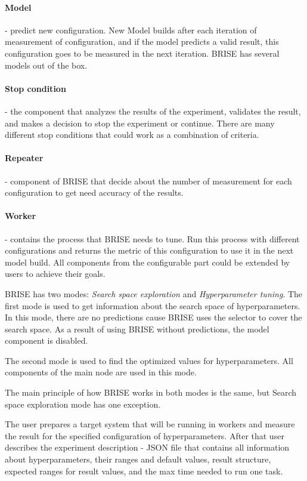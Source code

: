 \paragraph{Model} - predict new configuration. New Model builds after each iteration of measurement of configuration, and if the model predicts a valid result, this configuration goes to be measured in the next iteration. BRISE has several models out of the box.
\paragraph{Stop condition} - the component that analyzes the results of the experiment, validates the result, and makes a decision to stop the experiment or continue. There are many different stop conditions that could work as a combination of criteria.
\paragraph{Repeater} - component of BRISE that decide about the number of measurement for each configuration to get need accuracy of the results. 
\paragraph{Worker} - contains the process that BRISE needs to tune. Run this process with different configurations and returns the metric of this configuration to use it in the next model build.
All components from the configurable part could be extended by users to achieve their goals.

BRISE has two modes: \textit{Search space exploration} and \textit{Hyperparameter tuning}.
The first mode is used to get information about the search space of hyperparameters. In this mode, there are no predictions cause BRISE uses the selector to cover the search space. As a result of using BRISE without predictions, the model component is disabled.

The second mode is used to find the optimized values for hyperparameters. All components of the main node are used in this mode.

The main principle of how BRISE works in both modes is the same, but 
Search space exploration mode has one exception.

The user prepares a target system that will be running in workers and measure the result for the specified configuration of hyperparameters.
After that user describes the experiment description - JSON file that contains all information about hyperparameters, their ranges and default values, result structure, expected ranges for result values, and the max time needed to run one task.

